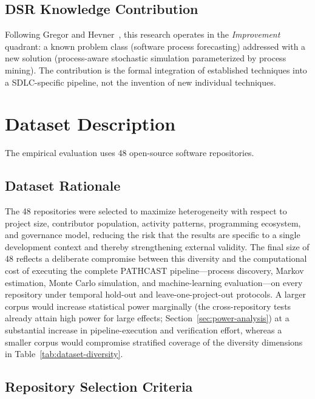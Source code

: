 \subsection{DSR Knowledge Contribution}
\label{sec:dsr-contribution}

Following Gregor and Hevner~\cite{gregor2013positioning}, this research
operates in the \emph{Improvement} quadrant: a known problem class
(software process forecasting) addressed with a new solution
(process-aware stochastic simulation parameterized by process mining).
The contribution is the formal integration of established techniques
into a SDLC-specific pipeline, not the invention of new individual
techniques.


\section{Dataset Description}
\label{sec:dataset}

The empirical evaluation uses 48 open-source software repositories.

\subsection{Dataset Rationale}
\label{sec:dataset-rationale}

The 48 repositories were selected to maximize heterogeneity with respect to
project size, contributor population, activity patterns, programming
ecosystem, and governance model, reducing the risk that the results are
specific to a single development context and thereby strengthening external
validity. The final size of 48 reflects a deliberate compromise between this
diversity and the computational cost of executing the complete PATHCAST
pipeline---process discovery, Markov estimation, Monte Carlo simulation, and
machine-learning evaluation---on every repository under temporal hold-out and
leave-one-project-out protocols. A larger corpus would increase statistical
power marginally (the cross-repository tests already attain high power for
large effects; Section~\ref{sec:power-analysis}) at a substantial increase in
pipeline-execution and verification effort, whereas a smaller corpus would
compromise stratified coverage of the diversity dimensions in
Table~\ref{tab:dataset-diversity}.

\subsection{Repository Selection Criteria}
\label{sec:selection-criteria}

